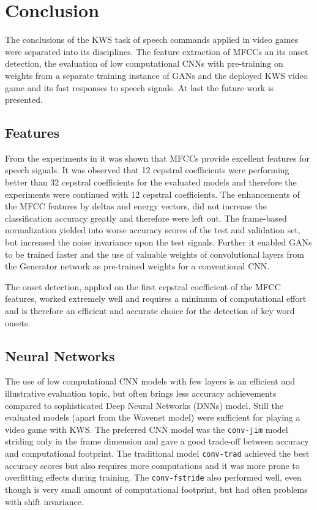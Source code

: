 
\chapter{Conclusion}\label{sec:conclusion}
The conclusions of the KWS task of speech commands applied in video games were separated into its disciplines.
The feature extraction of MFCCs an its onset detection, the evaluation of low computational CNNs with pre-training on weights from a separate training instance of GANs and the deployed KWS video game and its fast responses to speech signals.
At last the future work is presented.



\section{Features}
\thesisStateReady
From the experiments in  it was shown that MFCCs provide excellent features for speech signals.
It was observed that 12 cepstral coefficients were performing better than 32 cepstral coefficients for the evaluated models and therefore the experiments were continued with 12 cepstral coefficients.
The enhancements of the MFCC features by deltas and energy vectors, did not increase the classification accuracy greatly and therefore were left out.
The frame-based normalization yielded into worse accuracy scores of the test and validation set, but increased the noise invariance upon the test signals.
Further it enabled GANs to be trained faster and the use of valuable weights of convolutional layers from the Generator network as pre-trained weights for a conventional CNN.

The onset detection, applied on the first cepstral coefficient of the MFCC features, worked extremely well and requires a minimum of computational effort and is therefore an efficient and accurate choice for the detection of key word onsets.



\section{Neural Networks}
\thesisStateReady
The use of low computational CNN models with few layers is an efficient and illustrative evaluation topic, but often brings less accuracy achievements compared to sophisticated Deep Neural Networks (DNNs) model.
Still the evaluated models (apart from the Wavenet model) were sufficient for playing a video game with KWS.
The preferred CNN model was the \texttt{conv-jim} model striding only in the frame dimension and gave a good trade-off between accuracy and computational footprint.
The traditional model \texttt{conv-trad} achieved the best accuracy scores but also requires more computations and it was more prone to overfitting effects during training.
The \texttt{conv-fstride} also performed well, even though is very small amount of computational footprint, but had often problems with shift invariance.

